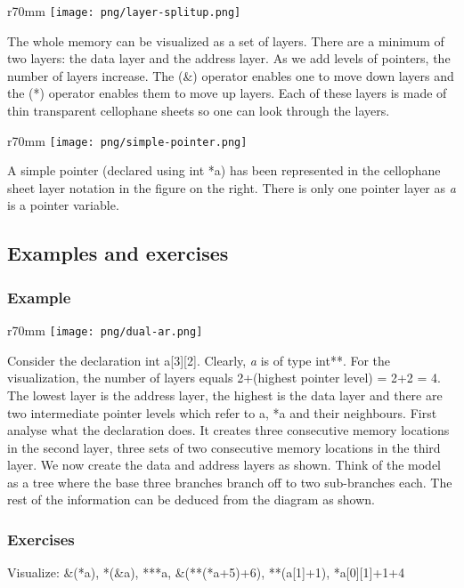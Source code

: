 \documentclass[10pt,twoside]{article}
\begin{document}
\begin{wrapfigure}{r}{70mm}
\texttt{[image: png/layer-splitup.png]}
\end{wrapfigure}

The whole memory can be visualized as a set of layers. There are a minimum of
two layers: the data layer and the address layer. As we add levels of pointers,
the number of layers increase. The (\&) operator enables one to move down layers
and the (*) operator enables them to move up layers. Each of these layers is
made of thin transparent cellophane sheets so one can look through the layers.

\begin{wrapfigure}{r}{70mm}
\texttt{[image: png/simple-pointer.png]}
\end{wrapfigure}

A simple pointer (declared using int *a) has been represented in the cellophane
sheet layer notation in the figure on the right. There is only one pointer layer
as \textit{a} is a pointer variable.

\subsection*{Examples and exercises}
\subsubsection*{Example}

\begin{wrapfigure}{r}{70mm}
\texttt{[image: png/dual-ar.png]}
\end{wrapfigure}

Consider the declaration int a[3][2]. Clearly, \textit{a }\textup{is of type
int**. For the visualization, the number of layers equals 2+(highest pointer
level) = 2+2 = 4. The lowest layer is the address layer, the highest is the data
layer and there are two intermediate pointer levels which refer to a, *a and
their neighbours.  First analyse what the declaration does. It creates three
consecutive memory locations in the second layer, three sets of two consecutive
memory locations in the third layer. We now create the data and address layers
as shown. Think of the model as a tree where the base three branches branch off
to two sub-branches each. The rest of the information can be deduced from the
diagram as shown.}

\subsubsection*{Exercises}
Visualize: \&(*a), *(\&a), ***a, \&(**(*a+5)+6), **(a[1]+1),
*a[0][1]+1+4
\newpage
\end{document}
